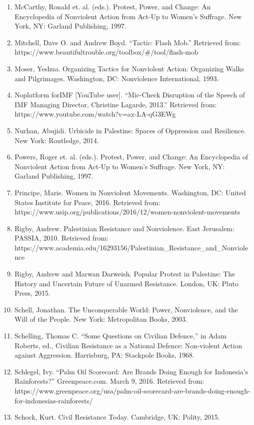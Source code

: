 \documentclass[twoside,a4paper,12pt,fleqn,openany]{extbook}
\begin{document}
\begin{enumerate}
\item McCarthy, Ronald et. al. (eds.). Protest, Power, and Change: An Encyclopedia of Nonviolent Action from Act-Up to Women’s Suffrage. New York, NY: Garland Publishing, 1997.
\item Mitchell, Dave O. and Andrew Boyd. “Tactic: Flash Mob.” Retrieved from: https://www.beautifultrouble.org/toolbox/#/tool/flash-mob
\item Moser, Yeshua. Organizing Tactics for Nonviolent Action: Organizing Walks and Pilgrimages. Washington, DC: Nonviolence International, 1993.
\item Noplatform forIMF [YouTube user]. “Mic-Check Disruption of the Speech of IMF Managing Director, Christine Lagarde, 2013.” Retrieved from: https://www.youtube.com/watch?v=ax-LA-qG3EWg
\item Nurhan, Abujidi. Urbicide in Palestine: Spaces of Oppression and Resilience. New York: Routledge, 2014.
\item Powers, Roger et. al. (eds.). Protest, Power, and Change: An Encyclopedia of Nonviolent Action from Act-Up to Women’s Suffrage. New York, NY: Garland Publishing, 1997.
\item Principe, Marie. Women in Nonviolent Movements. Washington, DC: United States Institute for Peace, 2016. Retrieved from: https://www.usip.org/publications/2016/12/women-nonviolent-movements
\item Rigby, Andrew. Palestinian Resistance and Nonviolence. East Jerusalem: PASSIA, 2010. Retrieved from: https://www.academia.edu/16293156/Palestinian_Resistance_and_Nonviolence
\item Rigby, Andrew and Marwan Darweish. Popular Protest in Palestine: The History and Uncertain Future of Unarmed Resistance. London, UK: Pluto Press, 2015.
\item Schell, Jonathan. The Unconquerable World: Power, Nonviolence, and the Will of the People. New York: Metropolitan Books, 2003.
\item Schelling, Thomas C. “Some Questions on Civilian Defence,” in Adam Roberts, ed., Civilian Resistance as a National Defence: Non-violent Action against Aggression. Harrisburg, PA: Stackpole Books, 1968.
\item Schlegel, Ivy. “Palm Oil Scorecard: Are Brands Doing Enough for Indonesia’s Rainforests?” Greenpeace.com. March 9, 2016. Retrieved from: https://www.greenpeace.org/usa/palm-oil-scorecard-are-brands-doing-enough-for-indonesias-rainforests/
\item Schock, Kurt. Civil Resistance Today. Cambridge, UK: Polity, 2015.

\end{enumerate}
\end{document}
